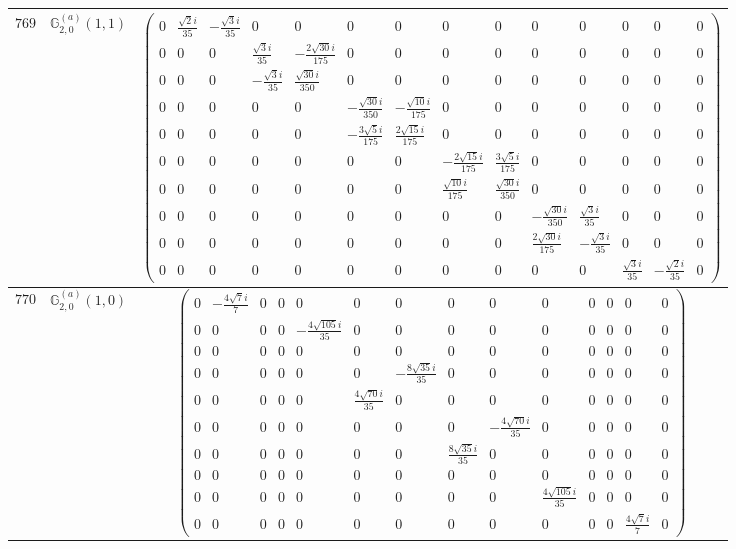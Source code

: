 \documentclass[fleqn,8pt,landscape]{jsarticle}
\begin{document}
\begin{center}
\begin{longtable}{ccc}
$ 769 $ & $ \mathbb{G}_{2,0}^{(a)}(1,1) $ & $ \begin{pmatrix} 0 & \frac{\sqrt{2} i}{35} & - \frac{\sqrt{3} i}{35} & 0 & 0 & 0 & 0 & 0 & 0 & 0 & 0 & 0 & 0 & 0 \\ 0 & 0 & 0 & \frac{\sqrt{3} i}{35} & - \frac{2 \sqrt{30} i}{175} & 0 & 0 & 0 & 0 & 0 & 0 & 0 & 0 & 0 \\ 0 & 0 & 0 & - \frac{\sqrt{3} i}{35} & \frac{\sqrt{30} i}{350} & 0 & 0 & 0 & 0 & 0 & 0 & 0 & 0 & 0 \\ 0 & 0 & 0 & 0 & 0 & - \frac{\sqrt{30} i}{350} & - \frac{\sqrt{10} i}{175} & 0 & 0 & 0 & 0 & 0 & 0 & 0 \\ 0 & 0 & 0 & 0 & 0 & - \frac{3 \sqrt{5} i}{175} & \frac{2 \sqrt{15} i}{175} & 0 & 0 & 0 & 0 & 0 & 0 & 0 \\ 0 & 0 & 0 & 0 & 0 & 0 & 0 & - \frac{2 \sqrt{15} i}{175} & \frac{3 \sqrt{5} i}{175} & 0 & 0 & 0 & 0 & 0 \\ 0 & 0 & 0 & 0 & 0 & 0 & 0 & \frac{\sqrt{10} i}{175} & \frac{\sqrt{30} i}{350} & 0 & 0 & 0 & 0 & 0 \\ 0 & 0 & 0 & 0 & 0 & 0 & 0 & 0 & 0 & - \frac{\sqrt{30} i}{350} & \frac{\sqrt{3} i}{35} & 0 & 0 & 0 \\ 0 & 0 & 0 & 0 & 0 & 0 & 0 & 0 & 0 & \frac{2 \sqrt{30} i}{175} & - \frac{\sqrt{3} i}{35} & 0 & 0 & 0 \\ 0 & 0 & 0 & 0 & 0 & 0 & 0 & 0 & 0 & 0 & 0 & \frac{\sqrt{3} i}{35} & - \frac{\sqrt{2} i}{35} & 0 \end{pmatrix} $ \\ \hline
$ 770 $ & $ \mathbb{G}_{2,0}^{(a)}(1,0) $ & $ \begin{pmatrix} 0 & - \frac{4 \sqrt{7} i}{7} & 0 & 0 & 0 & 0 & 0 & 0 & 0 & 0 & 0 & 0 & 0 & 0 \\ 0 & 0 & 0 & 0 & - \frac{4 \sqrt{105} i}{35} & 0 & 0 & 0 & 0 & 0 & 0 & 0 & 0 & 0 \\ 0 & 0 & 0 & 0 & 0 & 0 & 0 & 0 & 0 & 0 & 0 & 0 & 0 & 0 \\ 0 & 0 & 0 & 0 & 0 & 0 & - \frac{8 \sqrt{35} i}{35} & 0 & 0 & 0 & 0 & 0 & 0 & 0 \\ 0 & 0 & 0 & 0 & 0 & \frac{4 \sqrt{70} i}{35} & 0 & 0 & 0 & 0 & 0 & 0 & 0 & 0 \\ 0 & 0 & 0 & 0 & 0 & 0 & 0 & 0 & - \frac{4 \sqrt{70} i}{35} & 0 & 0 & 0 & 0 & 0 \\ 0 & 0 & 0 & 0 & 0 & 0 & 0 & \frac{8 \sqrt{35} i}{35} & 0 & 0 & 0 & 0 & 0 & 0 \\ 0 & 0 & 0 & 0 & 0 & 0 & 0 & 0 & 0 & 0 & 0 & 0 & 0 & 0 \\ 0 & 0 & 0 & 0 & 0 & 0 & 0 & 0 & 0 & \frac{4 \sqrt{105} i}{35} & 0 & 0 & 0 & 0 \\ 0 & 0 & 0 & 0 & 0 & 0 & 0 & 0 & 0 & 0 & 0 & 0 & \frac{4 \sqrt{7} i}{7} & 0 \end{pmatrix} $ \\ \hline

\end{longtable}
\end{center}
\end{document}
